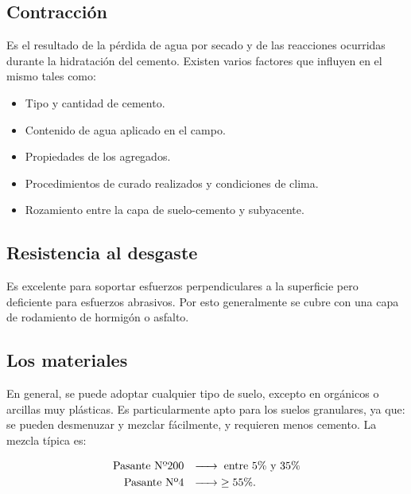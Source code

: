 \documentclass[../main.tex]{subfiles}
\begin{document}
\subsection{Contracción}

Es el resultado de la pérdida de agua por secado y de las reacciones ocurridas
durante la hidratación del cemento. Existen varios factores que influyen en el
mismo tales como:

\begin{itemize}
  \item Tipo y cantidad de cemento.
  \item Contenido de agua aplicado en el campo.
  \item Propiedades de los agregados.
  \item Procedimientos de curado realizados y condiciones de clima.
  \item Rozamiento entre la capa de suelo-cemento y subyacente.
\end{itemize}

\subsection{Resistencia al desgaste}

Es excelente para soportar esfuerzos perpendiculares a la superficie pero 
deficiente para esfuerzos abrasivos. Por esto generalmente se cubre con una capa
de rodamiento de hormigón o asfalto.

\subsection{Los materiales}

En general, se puede adoptar cualquier tipo de suelo, excepto en orgánicos o 
arcillas muy plásticas. Es particularmente apto para los suelos granulares, ya
que: se pueden desmenuzar y mezclar fácilmente, y requieren menos cemento. La
mezcla típica es:

\begin{align*}
  \text{Pasante Nº200} & \hspace{0.25cm} \xrightarrow{\hspace*{0.5cm}} \hspace{0.1cm} \text{entre 5\% y 35\%} \\
  \text{Pasante Nº4} & \hspace{0.25cm} \xrightarrow{\hspace*{0.5cm}} \hspace{0.1cm} \geq 55\% 
.\end{align*}
\end{document}
